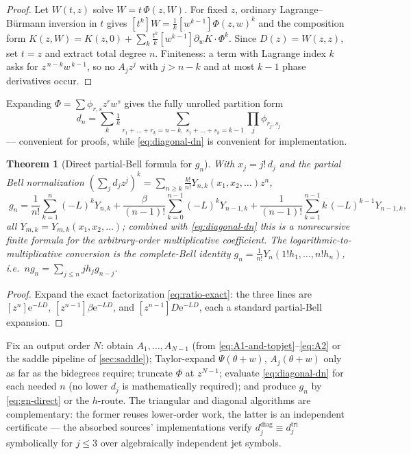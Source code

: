 \documentclass[11pt,oneside]{article}
\numberwithin{equation}{section}
\newtheorem{theorem}{Theorem}[section]
\theoremstyle{definition}
\theoremstyle{remark}
\newcommand{\e}{\mathrm e}
\newcommand{\Bell}{Y}
\begin{document}
\begin{proof}
Let $W(t,z)$ solve $W=t\,\Phi(z,W)$.  For fixed $z$, ordinary
Lagrange--B\"urmann inversion in $t$ gives
$[t^{k}]W=\tfrac1k[w^{k-1}]\Phi(z,w)^{k}$ and the composition form
$K(z,W)=K(z,0)+\sum_k\tfrac{t^{k}}k[w^{k-1}]\partial_wK\cdot\Phi^{k}$.
Since $D(z)=W(z,z)$, set $t=z$ and extract total degree $n$.
Finiteness: a term with Lagrange index $k$ asks for
$z^{\,n-k}w^{\,k-1}$, so no $A_jz^{j}$ with $j>n-k$ and at most $k-1$
phase derivatives occur.
\end{proof}

Expanding $\Phi=\sum\phi_{r,s}z^{r}w^{s}$ gives the fully unrolled
partition form
\[
 d_n=\sum_k\tfrac1k
 \sum_{r_1+\dots+r_k=n-k,\;s_1+\dots+s_k=k-1}
 \prod_j\phi_{r_j,s_j}
\]
--- convenient for proofs, while
\eqref{eq:diagonal-dn} is convenient for implementation.

\begin{theorem}[Direct partial-Bell formula for $g_n$]
\label{thm:direct-gn}
With $x_j=j!\,d_j$ and the partial Bell normalization
$(\sum_jd_jz^{j})^{k}
=\sum_{n\ge k}\frac{k!}{n!}\Bell_{n,k}(x_1,x_2,\dots)z^{n}$,
\begin{equation}
 \boxed{\;
 g_n=\frac1{n!}\sum_{k=1}^{n}(-L)^{k}\Bell_{n,k}
 +\frac{\beta}{(n-1)!}\sum_{k=0}^{n-1}(-L)^{k}\Bell_{n-1,k}
 +\frac1{(n-1)!}\sum_{k=1}^{n-1}k\,(-L)^{k-1}\Bell_{n-1,k},
 \;}
 \label{eq:gn-direct}
\end{equation}
all $\Bell_{m,k}=\Bell_{m,k}(x_1,x_2,\dots)$; combined with
\eqref{eq:diagonal-dn} this is a nonrecursive finite formula for the
arbitrary-order multiplicative coefficient.  The
logarithmic-to-multiplicative conversion is the complete-Bell
identity $g_n=\frac1{n!}\Bell_n(1!h_1,\dots,n!h_n)$, i.e.\
$ng_n=\sum_{j\le n}jh_jg_{n-j}$.
\end{theorem}

\begin{proof}
Expand the exact factorization \eqref{eq:ratio-exact}: the three
lines are $[z^{n}]\e^{-LD}$, $[z^{n-1}]\beta\e^{-LD}$, and
$[z^{n-1}]D\e^{-LD}$, each a standard partial-Bell expansion.
\end{proof}

\begin{algorithm}
\label{alg:generation}
Fix an output order $N$: obtain $A_1,\dots,A_{N-1}$ (from
\eqref{eq:A1-and-topjet}--\eqref{eq:A2} or the saddle pipeline of
\cref{sec:saddle}); Taylor-expand $\Psi(\theta+w)$, $A_j(\theta+w)$
only as far as the bidegrees require; truncate $\Phi$ at
$z^{N-1}$; evaluate \eqref{eq:diagonal-dn} for each needed $n$
(no lower $d_j$ is mathematically required); and produce $g_n$ by
\eqref{eq:gn-direct} or the $h$-route.  The triangular and diagonal
algorithms are complementary: the former reuses lower-order work, the
latter is an independent certificate --- the absorbed sources'
implementations verify
$d^{\mathrm{diag}}_j\equiv d^{\mathrm{tri}}_j$ symbolically for
$j\le3$ over algebraically independent jet symbols.
\end{algorithm}
\end{document}
